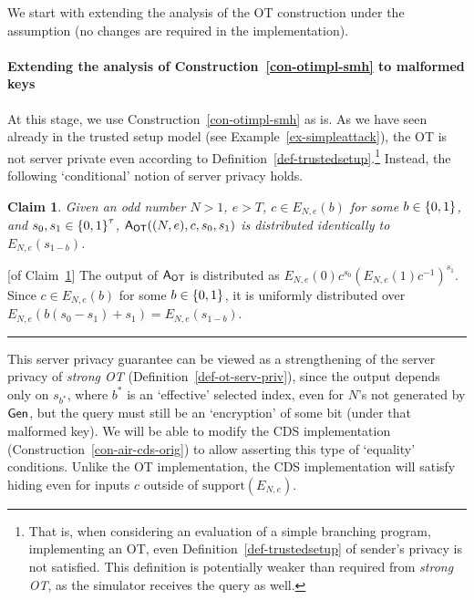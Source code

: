 \documentclass[11pt]{article}
\newtheorem{claim}[theorem]{Claim}
\newenvironment{proof}{\noindent {\bf Proof:} \hspace{.677em}}%
                     {\qed}
\newcommand{\qed}{\hspace*{\fill}\rule{0.6em}{0.6em}}
\newcommand{\gen}{{\sf Gen}}
\newcommand{\ansot}{{\sf A_{OT}}}
\newcommand{\otl}{{\tau}}
\newcommand{\encdj}{{E}_{N,e}}
\newcommand\ot{\mbox{OT}\xspace}
\newcommand\strongot{{\em strong \ot\xspace}}
\newcommand{\encr}[2]{E_{#1}(#2)}
\newcommand{\mathify}[1]{\ifmmode{#1}\else\mbox{$#1$}\fi}
\newcommand{\set}[2][]{\mathify{{\left\{#2\right\}}^{#1}}}
\newcommand{\bools}[1][]{\set[#1]{0,1}}
\newcommand{\support}{{\mathrm{support}}}
\begin{document}

We start with extending the analysis of the \ot construction under the assumption (no changes are required in the implementation).
\paragraph{Extending the analysis of Construction~\ref{con-otimpl-smh} to malformed keys}
At this stage, we use Construction~\ref{con-otimpl-smh} as is. As we have seen already in the trusted setup model (see Example~\ref{ex-simpleattack}), the \ot is not server private even according to Definition~\ref{def-trustedsetup}.\footnote{That is, when considering an evaluation of a simple branching program, implementing an OT,
even Definition~\ref{def-trustedsetup} of sender's privacy is not satisfied. This definition is potentially weaker than required from \strongot, as the simulator receives the query as well.} Instead, the following `conditional' notion of server privacy holds.
\begin{claim}
\label{clm-ot-priv-mal}
Given an odd number $N>1$, $e>T$, $c\in\encdj(b)$ for some $b\in\bools$, and $s_0,s_1\in{\bools[\otl]}$, $\ansot((N,e),c,s_0,s_1)$ is distributed identically to $\encr{N,e}{s_{1-b}}$.
\end{claim}
\begin{proof}[of Claim~\ref{clm-ot-priv-mal}]
The output of $\ansot$ is distributed as $\encdj(0)c^{s_0}(\encdj(1)c^{-1})^{s_1}$. Since $c\in\encdj(b)$
for some $b\in\bools$, it is uniformly distributed over $\encdj(b(s_0-s_1)+s_1)=\encdj(s_{1-b})$.
\end{proof}

This server privacy guarantee can be viewed as a strengthening of
the server privacy of \strongot
(Definition~\ref{def-ot-serv-priv}), since the output depends only
on $s_{b^*}$, where $b^*$ is an `effective' selected index, even
for $N$'s not generated by $\gen$, but the query must still be an
`encryption' of some bit (under that malformed key). We will be
able to modify the CDS implementation
(Construction~\ref{con-air-cds-orig}) to allow asserting this type
of `equality' conditions. Unlike the \ot implementation, the CDS
implementation will satisfy hiding even for inputs $c$ outside of
$\support(\encdj)$.
\end{document}
